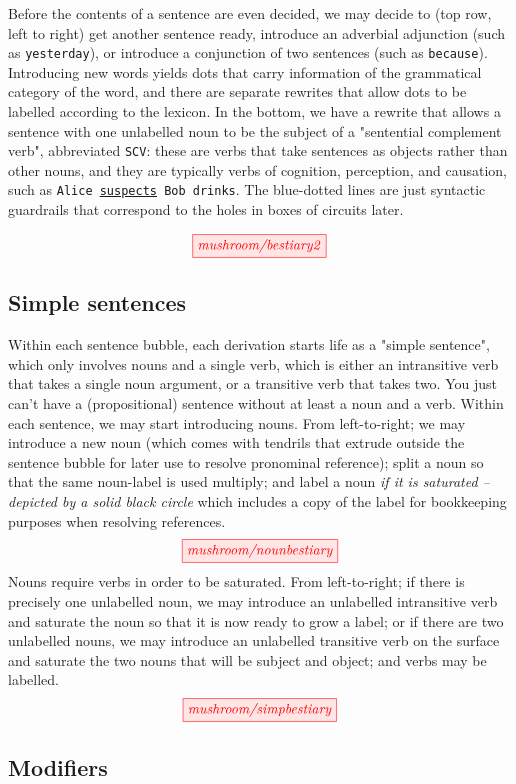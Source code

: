 Before the contents of a sentence are even decided, we may decide to (top row, left to right) get another sentence ready, introduce an adverbial adjunction (such as \texttt{yesterday}), or introduce a conjunction of two sentences (such as \texttt{because}). Introducing new words yields dots that carry information of the grammatical category of the word, and there are separate rewrites that allow dots to be labelled according to the lexicon. In the bottom, we have a rewrite that allows a sentence with one unlabelled noun to be the subject of a "sentential complement verb", abbreviated \texttt{SCV}: these are verbs that take sentences as objects rather than other nouns, and they are typically verbs of cognition, perception, and causation, such as \texttt{Alice \underline{suspects} Bob drinks}. The blue-dotted lines are just syntactic guardrails that correspond to the holes in boxes of circuits later.

\[
\tikzfig{mushroom/bestiary2}
\]

\subsection{Simple sentences}
Within each sentence bubble, each derivation starts life as a "simple sentence", which only involves nouns and a single verb, which is either an intransitive verb that takes a single noun argument, or a transitive verb that takes two. You just can't have a (propositional) sentence without at least a noun and a verb. Within each sentence, we may start introducing nouns. From left-to-right; we may introduce a new noun (which comes with tendrils that extrude outside the sentence bubble for later use to resolve pronominal reference); split a noun so that the same noun-label is used multiply; and label a noun \emph{if it is saturated -- depicted by a solid black circle} which includes a copy of the label for bookkeeping purposes when resolving references.
\[
\tikzfig{mushroom/nounbestiary}
\]
Nouns require verbs in order to be saturated. From left-to-right; if there is precisely one unlabelled noun, we may introduce an unlabelled intransitive verb and saturate the noun so that it is now ready to grow a label; or if there are two unlabelled nouns, we may introduce an unlabelled transitive verb on the surface and saturate the two nouns that will be subject and object; and verbs may be labelled.
\[
\tikzfig{mushroom/simpbestiary}
\]

\subsection{Modifiers}

